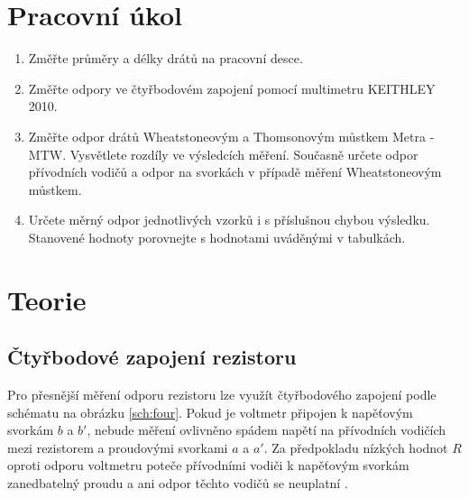 \documentclass{../concepts/prepareprotokol} %
\begin{document}
\renewcommand{\figurename}{Graf}
\renewcommand{\refname}{Literatura}

\maketitle

\section{Pracovní úkol}
\begin{enumerate}
    \item Změřte průměry a délky drátů na pracovní desce.

    \item Změřte odpory ve čtyřbodovém zapojení pomocí multimetru KEITHLEY 2010.
    
    \item Změřte odpor drátů Wheatstoneovým a Thomsonovým můstkem Metra - MTW. Vysvětlete rozdíly ve výsledcích měření. Současně určete odpor přívodních vodičů a odpor na svorkách v případě měření Wheatstoneovým můstkem.
    
    \item Určete měrný odpor jednotlivých vzorků i s příslušnou chybou výsledku. Stanovené hodnoty porovnejte s hodnotami uváděnými v tabulkách.

\end{enumerate}

\section{Teorie}

\subsection{Čtyřbodové zapojení rezistoru}

Pro přesnější měření odporu rezistoru lze využít čtyřbodového zapojení podle schématu na obrázku \ref{sch:four}. Pokud je voltmetr připojen k napěťovým svorkám $b$ a $b'$, nebude měření ovlivněno spádem napětí na přívodních vodičích mezi rezistorem a proudovými svorkami $a$ a $a'$. Za předpokladu nízkých hodnot $R$ oproti odporu voltmetru poteče přívodními vodiči k napěťovým svorkám zanedbatelný proudu a ani odpor těchto vodičů se neuplatní \cite{studijni}.
\end{document}
